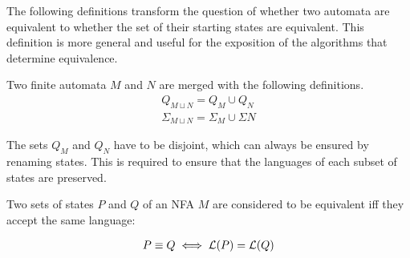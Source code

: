 The following definitions transform the question of
whether two automata are equivalent to
whether the set of their starting states are equivalent.
This definition is more general and useful
for the exposition of the algorithms that determine equivalence.

\begin{definition}
    Two finite automata $M$ and $N$ are merged with the following definitions.
    \begin{align}
        Q_{M \sqcup N} = Q_M \cup Q_N \\
        \Sigma_{M \sqcup N} = \Sigma_M \cup \Sigma N
    \end{align}

    The sets $Q_M$ and $Q_N$ have to be disjoint, which
    can always be ensured by renaming states.
    This is required to ensure that the languages of each subset of states are preserved.
\end{definition}

\begin{definition}
    Two sets of states $P$ and $Q$ of an NFA $M$ are considered
    to be equivalent iff they accept the same language:

    \begin{align}
        P \equiv Q \iff \mathcal{L}(P) = \mathcal{L}(Q)
    \end{align}
\end{definition}
